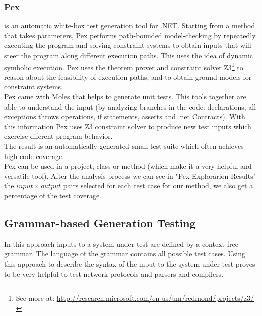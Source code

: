 \documentclass[10pt, conference, compsocconf]{IEEEtran}
\begin{document}
\subsubsection{\textbf{Pex}\cite{Tillmann:2008:PWB:1792786.1792798}} is an automatic white-box test generation tool for .NET. Starting from a
method that takes parameters, Pex performs path-bounded model-checking
by repeatedly executing the program and solving constraint systems to obtain inputs that will steer the program along different execution paths.
This uses the idea of dynamic symbolic execution\cite{Tillmann06unittests}. Pex uses the theorem prover and
constraint solver Z3\footnote{See more at: \url{http://research.microsoft.com/en-us/um/redmond/projects/z3/}} to reason about the feasibility of execution paths, and
to obtain ground models for constraint systems.\\
Pex came with Moles that helps to generate unit tests. This tools together are able to understand the input (by analyzing branches in the code:
declarations, all exceptions throws operations, if statements, asserts and .net Contracts). With this information Pex uses Z3 constraint solver to
produce new test inputs which exercise diferent program behavior.\\
The result is an automatically generated small test suite which often achieves high code coverage.\\
Pex can be used in a project, class or method (which make it a very helpful and versatile tool). After the analysis process we can see in "Pex Explorarion Results"
the $input \times output$ pairs selected for each test case for our method, we also get a percentage of the test coverage.

\subsection{Grammar-based Generation Testing}
In this approach inputs to a system under test are defined by a context-free grammar. The language of the grammar contains all possible test cases.
Using this approach to describe the syntax of the input to the system under test proves to be very helpful to test
network protocols\cite{tal:syntax-based,kaksonen2001functional} and parsers and compilers\cite{1994-burgess,Burgess_Saidi_1996}.
\end{document}
